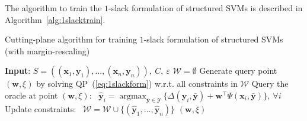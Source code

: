 \documentclass[9pt]{extarticle}
\DeclareMathOperator*{\argmax}{argmax}
\begin{document}
The algorithm to train the $1$-slack formulation of structured SVMs is described in Algorithm~\ref{alg:1slacktrain}.

\begin{algorithm}[htbp]
\caption{Cutting-plane algorithm for training $1$-slack formulation of structured SVMs (with margin-rescaling)}
\label{alg:1slacktrain}
\begin{algorithmic}[1]
\STATE \textbf{Input}: $S = \left( (\mathbf{x}_1, \mathbf{y}_1), \dots, (\mathbf{x}_n, \mathbf{y}_n) \right),~ C,~ \varepsilon$
\STATE $\mathcal{W} = \emptyset$
\REPEAT
    \STATE Generate query point $(\mathbf{w}, \xi)$ by solving QP~(\ref{eq:1slackform}) w.r.t. all constraints in $\mathcal{W}$
    \STATE Query the oracle at point $(\mathbf{w}, \xi)$:~
           $\hat{\mathbf{y}}_i = \argmax_{\bar{\mathbf{y}} \in \mathcal{Y}} \{ \Delta(\mathbf{y}_i, \bar{\mathbf{y}}) + 
           \mathbf{w}^\top \Psi(\mathbf{x}_i, \bar{\mathbf{y}}) \},~ \forall i$
    \STATE Update constraints:~
           $\mathcal{W} = \mathcal{W} \cup \{ (\hat{\mathbf{y}}_1, \dots, \hat{\mathbf{y}}_n) \}$
\RETURN $(\mathbf{w}, \xi)$
\end{algorithmic}
\end{algorithm}
\end{document}
